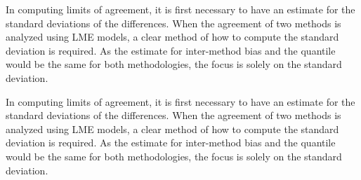 \documentclass[12pt, a4paper]{article}
\theoremstyle{plain}
\theoremstyle{definition}
\theoremstyle{remark}
\begin{document}
In computing limits of agreement, it is first necessary to have an estimate for the standard deviations of the differences. When the agreement of two methods is analyzed using LME models, a clear method of how to compute the standard deviation is required. As the estimate for inter-method bias and the quantile would be the same for both methodologies, the focus is solely on the standard deviation.









\newpage

In computing limits of agreement, it is first necessary to have an estimate for the standard deviations of the differences. When the agreement of two methods is analyzed using LME models, a clear method of how to compute the standard deviation is required. As the estimate for inter-method bias and the quantile would be the same for both methodologies, the focus is solely on the standard deviation.



















	
	

	

	

	
	

	
	
	
	
	
\end{document}
